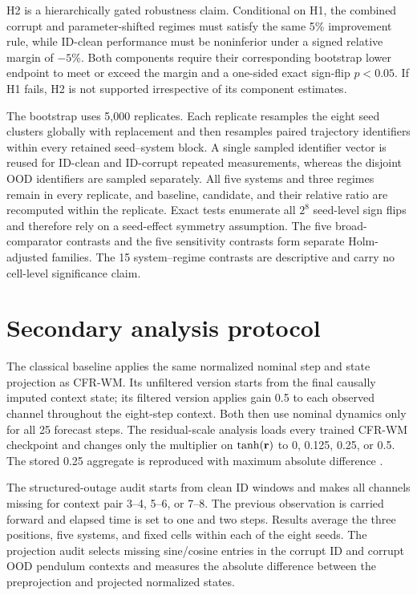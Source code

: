 H2 is a hierarchically gated robustness claim. Conditional on H1, the combined corrupt and parameter-shifted regimes must satisfy the same 5\% improvement rule, while ID-clean performance must be noninferior under a signed relative margin of $-5\%$. Both components require their corresponding bootstrap lower endpoint to meet or exceed the margin and a one-sided exact sign-flip $p<0.05$. If H1 fails, H2 is not supported irrespective of its component estimates.

The bootstrap uses 5,000 replicates. Each replicate resamples the eight seed clusters globally with replacement and then resamples paired trajectory identifiers within every retained seed--system block. A single sampled identifier vector is reused for ID-clean and ID-corrupt repeated measurements, whereas the disjoint OOD identifiers are sampled separately. All five systems and three regimes remain in every replicate, and baseline, candidate, and their relative ratio are recomputed within the replicate. Exact tests enumerate all $2^8$ seed-level sign flips and therefore rely on a seed-effect symmetry assumption. The five broad-comparator contrasts and the five sensitivity contrasts form separate Holm-adjusted families. The 15 system--regime contrasts are descriptive and carry no cell-level significance claim.

\section{Secondary analysis protocol}

The classical baseline applies the same normalized nominal step and state
projection as CFR-WM. Its unfiltered version starts from the final causally
imputed context state; its filtered version applies gain 0.5 to each observed
channel throughout the eight-step context. Both then use nominal dynamics only
for all 25 forecast steps. The residual-scale analysis loads every trained CFR-WM
checkpoint and changes only the multiplier on $\tanh(\mathbf{r})$ to 0, 0.125,
0.25, or 0.5. The stored 0.25 aggregate is reproduced with maximum absolute
difference \ResidualReconstructionDifference{}.

The structured-outage audit starts from clean ID windows and makes all channels
missing for context pair 3--4, 5--6, or 7--8. The previous observation is
carried forward and elapsed time is set to one and two steps. Results average
the three positions, five systems, and fixed cells within each of the eight
seeds. The projection audit selects missing sine/cosine entries in the corrupt
ID and corrupt OOD pendulum contexts and measures the absolute difference
between the preprojection and projected normalized states.

